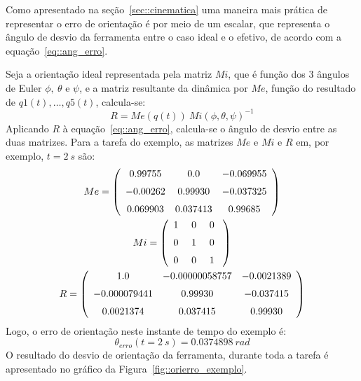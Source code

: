 Como apresentado na seção~\ref{sec::cinematica} uma maneira mais prática de
representar o erro de orientação é por meio de um escalar, que representa o
ângulo de desvio da ferramenta entre o caso ideal e o efetivo, de acordo com a
equação~\ref{eq::ang_erro}.


Seja a orientação ideal representada pela matriz $Mi$, que é função dos 3
ângulos de Euler $\phi,~\theta$ e $\psi$, e a matriz resultante da dinâmica por
$Me$, função do resultado de $q1(t),\ldots,q5(t)$, calcula-se:
%
\begin{equation}
	R = Me(q(t))~Mi(\phi,\theta,\psi)^{-1}
\end{equation}
%
Aplicando $R$ à equação~\ref{eq::ang_erro}, calcula-se o ângulo de desvio entre
as duas matrizes.
Para a tarefa do exemplo, as matrizes $Me$ e $Mi$ e $R$ em, por exemplo,
$t=2~s$ são:
%
 \begin{gather*}
 Me = \left( \begin {array}{ccc}  0.99755& 0.0&- 0.069955
\\ \noalign{\medskip}- 0.00262& 0.99930&- 0.037325
\\ \noalign{\medskip} 0.069903& 0.037413& 0.99685\end {array} \right) \\
 Mi =  \left( \begin {array}{ccc}  1~& 0~& 0~\\ \noalign{\medskip} 0~&
 1~& 0~\\ \noalign{\medskip} 0~& 0~& 1~\end {array} \right) \\
R =  \left( \begin {array}{ccc}  1.0&- 0.00000058757&- 0.0021389
\\ \noalign{\medskip}- 0.000079441& 0.99930&- 0.037415
\\ \noalign{\medskip} 0.0021374& 0.037415& 0.99930\end {array}
 \right)
\end{gather*}
%
Logo, o erro de orientação neste instante de tempo do exemplo é:
%
\begin{equation*}
	\theta_{erro}(t=2~s) = 0.0374898~rad
\end{equation*}
%
O resultado do desvio de orientação da ferramenta, durante toda a tarefa é
apresentado no gráfico da Figura~\ref{fig::orierro_exemplo}.

